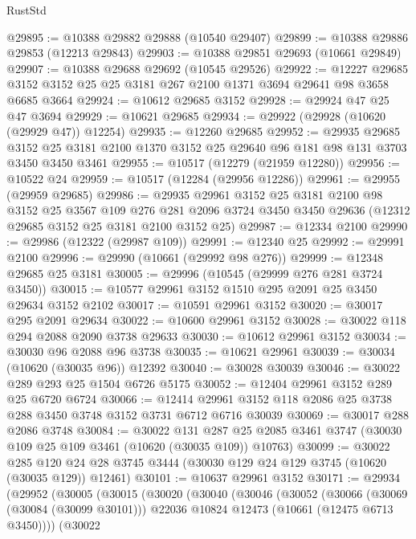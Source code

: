 \begin{lexlean}{RustStd}
\begin{coremodule}
@29895 := @10388 @29882 @29888 (@10540 @29407)
@29899 := @10388 @29886 @29853 (@12213 @29843)
@29903 := @10388 @29851 @29693 (@10661 @29849)
@29907 := @10388 @29688 @29692 (@10545 @29526)
@29922 := @12227
    @29685
    @3152
    @3152
    @25
    @25
    @3181
    @267
    @2100
    @1371
    @3694
    @29641
    @98
    @3658
    @6685
    @3664
@29924 := @10612 @29685 @3152
@29928 := @29924 @47 @25 @47 @3694
@29929 := @10621 @29685
@29934 := @29922 (@29928 (@10620 (@29929 @47)) @12254)
@29935 := @12260 @29685
@29952 := @29935
    @29685
    @3152
    @25
    @3181
    @2100
    @1370
    @3152
    @25
    @29640
    @96
    @181
    @98
    @131
    @3703
    @3450
    @3450
    @3461
@29955 := @10517 (@12279 (@21959 @12280))
@29956 := @10522 @24
@29959 := @10517 (@12284 (@29956 @12286))
@29961 := @29955 (@29959 @29685)
@29986 := @29935
    @29961
    @3152
    @25
    @3181
    @2100
    @98
    @3152
    @25
    @3567
    @109
    @276
    @281
    @2096
    @3724
    @3450
    @3450
    @29636
    (@12312 @29685 @3152 @25 @3181 @2100 @3152 @25)
@29987 := @12334 @2100
@29990 := @29986 (@12322 (@29987 @109))
@29991 := @12340 @25
@29992 := @29991 @2100
@29996 := @29990 (@10661 (@29992 @98 @276))
@29999 := @12348 @29685 @25 @3181
@30005 := @29996 (@10545 (@29999 @276 @281 @3724 @3450))
@30015 := @10577 @29961 @3152 @1510 @295 @2091 @25 @3450 @29634 @3152 @2102
@30017 := @10591 @29961 @3152
@30020 := @30017 @295 @2091 @29634
@30022 := @10600 @29961 @3152
@30028 := @30022 @118 @294 @2088 @2090 @3738 @29633
@30030 := @10612 @29961 @3152
@30034 := @30030 @96 @2088 @96 @3738
@30035 := @10621 @29961
@30039 := @30034 (@10620 (@30035 @96)) @12392
@30040 := @30028 @30039
@30046 := @30022 @289 @293 @25 @1504 @6726 @5175
@30052 := @12404 @29961 @3152 @289 @25 @6720 @6724
@30066 := @12414 @29961 @3152 @118 @2086 @25 @3738 @288 @3450 @3748 @3152 @3731 @6712 @6716 @30039
@30069 := @30017 @288 @2086 @3748
@30084 := @30022
    @131
    @287
    @25
    @2085
    @3461
    @3747
    (@30030 @109 @25 @109 @3461 (@10620 (@30035 @109)) @10763)
@30099 := @30022
    @285
    @120
    @24
    @28
    @3745
    @3444
    (@30030 @129 @24 @129 @3745 (@10620 (@30035 @129)) @12461)
@30101 := @10637 @29961 @3152
@30171 := @29934
    (@29952
      (@30005
        (@30015
          (@30020
            (@30040
              (@30046
                (@30052
                  (@30066
                    (@30069 (@30084 (@30099 @30101)))
                    @22036
                    @10824
                    @12473
                    (@10661 (@12475 @6713 @3450))))
                (@30022

\end{coremodule}
\end{lexlean}

